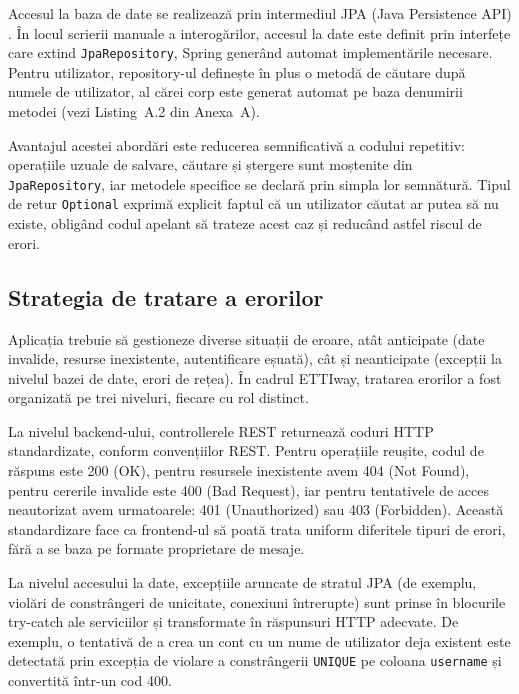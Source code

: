 Accesul la baza de date se realizează prin intermediul JPA (Java Persistence
API) \cite{Walls2022}. În locul
scrierii manuale a interogărilor, accesul la date este definit prin interfețe
care extind \texttt{JpaRepository}, Spring generând automat implementările
necesare. Pentru utilizator, repository-ul definește în plus o
metodă de căutare după numele de utilizator, al cărei corp este generat
automat pe baza denumirii metodei (vezi Listing~A.2 din Anexa~A).

Avantajul acestei abordări este reducerea semnificativă a codului repetitiv:
operațiile uzuale de salvare, căutare și ștergere sunt moștenite din
\texttt{JpaRepository}, iar metodele specifice se declară prin simpla lor
semnătură. Tipul de retur \texttt{Optional} exprimă explicit faptul că un
utilizator căutat ar putea să nu existe, obligând codul apelant să trateze
acest caz și reducând astfel riscul de erori.

\subsection{Strategia de tratare a erorilor}
\label{subsec:erori}
 
Aplicația trebuie să gestioneze diverse situații de eroare, atât anticipate
(date invalide, resurse inexistente, autentificare eșuată), cât și
neanticipate (excepții la nivelul bazei de date, erori de rețea). În cadrul
ETTIway, tratarea erorilor a fost organizată pe trei niveluri, fiecare cu
rol distinct.
 
La nivelul backend-ului, controllerele REST returnează coduri HTTP
standardizate, conform convențiilor REST. Pentru operațiile reușite, codul
de răspuns este 200 (OK), pentru resursele inexistente avem 404 (Not Found),
pentru cererile invalide este 400 (Bad Request), iar pentru tentativele de acces
neautorizat avem urmatoarele: 401 (Unauthorized) sau 403 (Forbidden). Această standardizare
face ca frontend-ul să poată trata uniform diferitele tipuri de erori, fără
a se baza pe formate proprietare de mesaje.
 
La nivelul accesului la date, excepțiile aruncate de stratul JPA (de exemplu,
violări de constrângeri de unicitate, conexiuni întrerupte) sunt prinse în
blocurile try-catch ale serviciilor și transformate în răspunsuri HTTP
adecvate. De exemplu, o tentativă de a crea un cont cu un nume de utilizator
deja existent este detectată prin excepția de violare a constrângerii
\texttt{UNIQUE} pe coloana \texttt{username} și convertită într-un cod 400.
 
